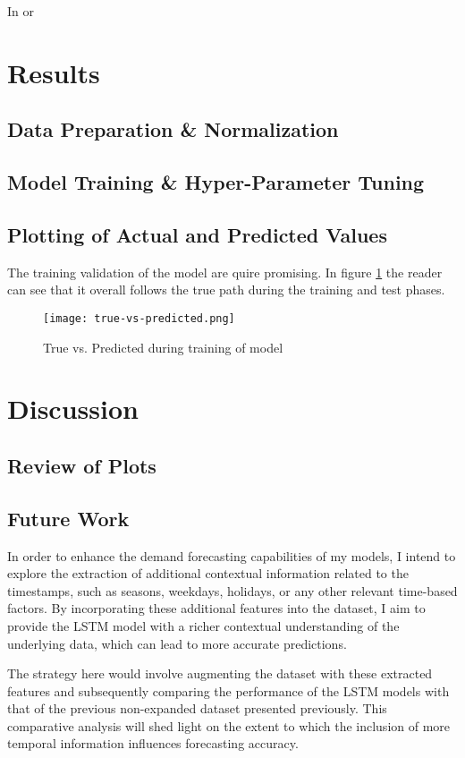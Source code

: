 \documentclass[10pt, journal, letterpaper, compsoc]{IEEEtran}
\begin{document}
In or


\section{Results}

\subsection{Data Preparation \& Normalization}

\subsection{Model Training \& Hyper-Parameter Tuning}

\subsection{Plotting of Actual and Predicted Values}
The training validation of the model are quire promising. In figure \ref{fig:true-vs-predicted} the reader can see that it overall follows the true path during the training and test phases. 

\begin{figure}[hp]
\centering
\captionsetup{justification=centering,margin=1cm}
\texttt{[image: true-vs-predicted.png]}
\caption{True vs. Predicted during training of model}
\label{fig:true-vs-predicted}
\end{figure}



\section{Discussion}

\subsection{Review of Plots}

\subsection{Future Work}
In order to enhance the demand forecasting capabilities of my models, I intend to explore the extraction of additional contextual information related to the timestamps, such as seasons, weekdays, holidays, or any other relevant time-based factors. By incorporating these additional features into the dataset, I aim to provide the LSTM model with a richer contextual understanding of the underlying data, which can lead to more accurate predictions.

The strategy here would involve augmenting the dataset with these extracted features and subsequently comparing the performance of the LSTM models with that of the previous non-expanded dataset presented previously. This comparative analysis will shed light on the extent to which the inclusion of more temporal information influences forecasting accuracy.



\clearpage
\printbibliography %
\end{document}
